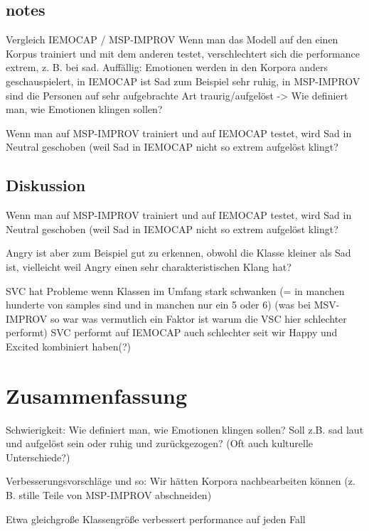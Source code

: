 \documentclass{article} %
\begin{document}
\subsection{notes}

Vergleich IEMOCAP / MSP-IMPROV
Wenn man das Modell auf den einen Korpus trainiert und mit dem anderen testet, verschlechtert sich die performance extrem, z. B. bei sad. Auffällig: Emotionen werden in den Korpora anders geschauspielert, in IEMOCAP ist Sad zum Beispiel sehr ruhig, in MSP-IMPROV sind die Personen auf sehr aufgebrachte Art traurig/aufgelöst
-> Wie definiert man, wie Emotionen klingen sollen?

Wenn man auf MSP-IMPROV trainiert und auf IEMOCAP testet, wird Sad in Neutral geschoben (weil Sad in IEMOCAP nicht so extrem aufgelöst klingt?

\subsection{Diskussion}

Wenn man auf MSP-IMPROV trainiert und auf IEMOCAP testet, wird Sad in Neutral geschoben (weil Sad in IEMOCAP nicht so extrem aufgelöst klingt?

Angry ist aber zum Beispiel gut zu erkennen, obwohl die Klasse kleiner als Sad ist, vielleicht weil Angry einen sehr charakteristischen Klang hat?

SVC hat Probleme wenn Klassen im Umfang stark schwanken (= in manchen hunderte von samples sind und in manchen nur ein 5 oder 6) (was bei MSV-IMPROV so war was vermutlich ein Faktor ist warum die VSC hier schlechter performt)
SVC performt auf IEMOCAP auch schlechter seit wir Happy und Excited kombiniert haben(?)

\section{Zusammenfassung}

Schwierigkeit: Wie definiert man, wie Emotionen klingen sollen? Soll z.B. sad laut und aufgelöst sein oder ruhig und zurückgezogen? (Oft auch kulturelle Unterschiede?)

Verbesserungsvorschläge und so: Wir hätten Korpora nachbearbeiten können (z. B. stille Teile von MSP-IMPROV abschneiden)

Etwa gleichgroße Klassengröße verbessert performance auf jeden Fall

\pagebreak
\tableofcontents
\pagebreak


\end{document}
